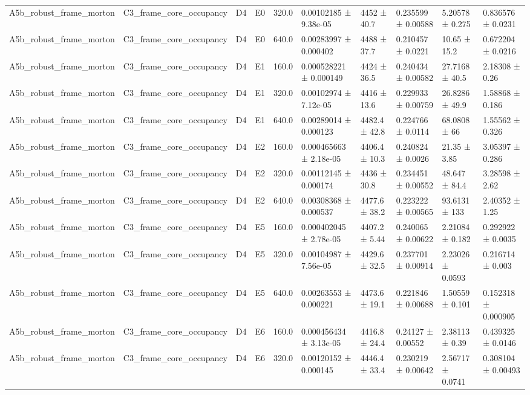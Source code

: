 \begin{table}
\begin{tabular}{llllllllll}
A5b\_robust\_frame\_morton & C3\_frame\_core\_occupancy & D4 & E0 & 320.0 & 0.00102185 ± 9.38e-05 & 4452 ± 40.7 & 0.235599 ± 0.00588 & 5.20578 ± 0.275 & 0.836576 ± 0.0231 \\
A5b\_robust\_frame\_morton & C3\_frame\_core\_occupancy & D4 & E0 & 640.0 & 0.00283997 ± 0.000402 & 4488 ± 37.7 & 0.210457 ± 0.0221 & 10.65 ± 15.2 & 0.672204 ± 0.0216 \\
A5b\_robust\_frame\_morton & C3\_frame\_core\_occupancy & D4 & E1 & 160.0 & 0.000528221 ± 0.000149 & 4424 ± 36.5 & 0.240434 ± 0.00582 & 27.7168 ± 40.5 & 2.18308 ± 0.26 \\
A5b\_robust\_frame\_morton & C3\_frame\_core\_occupancy & D4 & E1 & 320.0 & 0.00102974 ± 7.12e-05 & 4416 ± 13.6 & 0.229933 ± 0.00759 & 26.8286 ± 49.9 & 1.58868 ± 0.186 \\
A5b\_robust\_frame\_morton & C3\_frame\_core\_occupancy & D4 & E1 & 640.0 & 0.00289014 ± 0.000123 & 4482.4 ± 42.8 & 0.224766 ± 0.0114 & 68.0808 ± 66 & 1.55562 ± 0.326 \\
A5b\_robust\_frame\_morton & C3\_frame\_core\_occupancy & D4 & E2 & 160.0 & 0.000465663 ± 2.18e-05 & 4406.4 ± 10.3 & 0.240824 ± 0.0026 & 21.35 ± 3.85 & 3.05397 ± 0.286 \\
A5b\_robust\_frame\_morton & C3\_frame\_core\_occupancy & D4 & E2 & 320.0 & 0.00112145 ± 0.000174 & 4436 ± 30.8 & 0.234451 ± 0.00552 & 48.647 ± 84.4 & 3.28598 ± 2.62 \\
A5b\_robust\_frame\_morton & C3\_frame\_core\_occupancy & D4 & E2 & 640.0 & 0.00308368 ± 0.000537 & 4477.6 ± 38.2 & 0.223222 ± 0.00565 & 93.6131 ± 133 & 2.40352 ± 1.25 \\
A5b\_robust\_frame\_morton & C3\_frame\_core\_occupancy & D4 & E5 & 160.0 & 0.000402045 ± 2.78e-05 & 4407.2 ± 5.44 & 0.240065 ± 0.00622 & 2.21084 ± 0.182 & 0.292922 ± 0.0035 \\
A5b\_robust\_frame\_morton & C3\_frame\_core\_occupancy & D4 & E5 & 320.0 & 0.00104987 ± 7.56e-05 & 4429.6 ± 32.5 & 0.237701 ± 0.00914 & 2.23026 ± 0.0593 & 0.216714 ± 0.003 \\
A5b\_robust\_frame\_morton & C3\_frame\_core\_occupancy & D4 & E5 & 640.0 & 0.00263553 ± 0.000221 & 4473.6 ± 19.1 & 0.221846 ± 0.00688 & 1.50559 ± 0.101 & 0.152318 ± 0.000905 \\
A5b\_robust\_frame\_morton & C3\_frame\_core\_occupancy & D4 & E6 & 160.0 & 0.000456434 ± 3.13e-05 & 4416.8 ± 24.4 & 0.24127 ± 0.00552 & 2.38113 ± 0.39 & 0.439325 ± 0.0146 \\
A5b\_robust\_frame\_morton & C3\_frame\_core\_occupancy & D4 & E6 & 320.0 & 0.00120152 ± 0.000145 & 4446.4 ± 33.4 & 0.230219 ± 0.00642 & 2.56717 ± 0.0741 & 0.308104 ± 0.00493 \\

\end{tabular}
\end{table}
